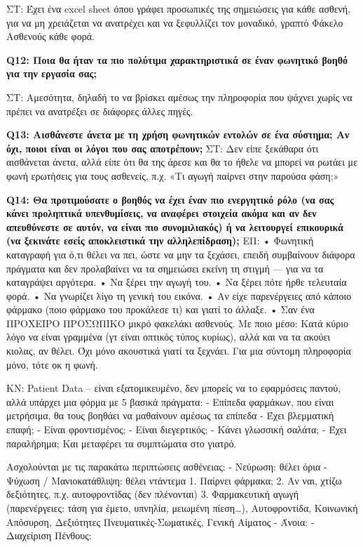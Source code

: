 ΣΤ: Έχει ένα excel sheet όπου γράφει προσωπικές της σημειώσεις για κάθε ασθενή, για να μη χρειάζεται να ανατρέχει και να ξεφυλλίζει τον μοναδικό, γραπτό Φάκελο Ασθενούς κάθε φορά. 

\textbf{Q12:	Ποια θα ήταν τα πιο πολύτιμα χαρακτηριστικά σε έναν φωνητικό βοηθό για την εργασία σας;}

ΣΤ: Αμεσότητα, δηλαδή το να βρίσκει αμέσως την πληροφορία που ψάχνει χωρίς να πρέπει να ανατρέξει σε διάφορες άλλες πηγές.


\textbf{Q13:	Αισθάνεστε άνετα με τη χρήση φωνητικών εντολών σε ένα σύστημα; Αν όχι, ποιοι είναι οι λόγοι που σας αποτρέπουν;}
ΣΤ: Δεν είπε ξεκάθαρα ότι αισθάνεται άνετα, αλλά είπε ότι θα της άρεσε και θα το ήθελε να μπορεί να ρωτάει με φωνή ερωτήσεις για τους ασθενείς, π.χ. «Τι αγωγή παίρνει στην παρούσα φάση;»

\textbf{Q14:	Θα προτιμούσατε ο βοηθός να έχει έναν πιο ενεργητικό ρόλο (να σας κάνει προληπτικά υπενθυμίσεις, να αναφέρει στοιχεία ακόμα και αν δεν απευθύνεστε σε αυτόν, να είναι πιο συνομιλιακός) ή να λειτουργεί επικουρικά (να ξεκινάτε εσείς αποκλειστικά την αλληλεπίδραση);}
ΕΠ:
•	Φωνητική καταγραφή για ό,τι θέλει να πει, ώστε να μην τα ξεχάσει, επειδή συμβαίνουν διάφορα πράγματα και δεν προλαβαίνει να τα σημειώσει εκείνη τη στιγμή — για να τα καταγράψει αργότερα.
• Να ξέρει την αγωγή του.
• Να ξέρει πότε ήρθε τελευταία φορά.
• Να γνωρίζει λίγο τη γενική του εικόνα.
• Αν είχε παρενέργειες από κάποιο φάρμακο (ποιο φάρμακο του προκάλεσε τι) και γιατί το άλλαξε.
•	Σαν ένα ΠΡΟΧΕΙΡΟ ΠΡΟΣΩΠΙΚΟ μικρό φακελάκι ασθενούς.
Με ποιο μέσο: Κατά κύριο λόγο να είναι γραμμένα (γτ είναι οπτικός τύπος κυρίως), αλλά και να τα ακούει κιολας, αν θέλει. Όχι μόνο ακουστικά γιατί τα ξεχνάει. Για μια σύντομη πληροφορία μόνο, τότε οκ η φωνή.

ΚΝ: Patient Data – είναι εξατομικευμένο, δεν μπορείς να το εφαρμόσεις παντού, αλλά υπάρχει μια φόρμα με 5 βασικά πράγματα:
-	Επίπεδα φαρμάκων, που είναι μετρήσιμα, θα τους βοηθάει να μαθαίνουν αμέσως τα επίπεδα
-	Έχει βλεμματική επαφή;
-	Είναι φροντισμένος;
-	Είναι διεγερτικός;
-	Κάνει γλωσσική σαλάτα;
-	Έχει παραλήρημα;
Και μεταφέρει τα συμπτώματα στο γιατρό.

Ασχολούνται με τις παρακάτω περιπτώσεις ασθένειας:
-	Νεύρωση: θέλει όρια
-	Ψύχωση / Μανιοκατάθλιψη: θέλει ντάντεμα
1.	Παίρνει φάρμακα;
2.	Αν ναι, χτίζω δεξιότητες, π.χ. αυτοφροντίδας (δεν πλένονται)
3.	Φαρμακευτική αγωγή (παρενέργειες: τάση για έμετο, υπνηλία, μειωμένη πίεση…), Αυτοφροντίδα, Κοινωνική Απόσυρση, Δεξιότητες Πνευματικές-Σωματικές, Γενική Αίματος
-	Άνοια:
-	Διαχείριση Πένθους:

